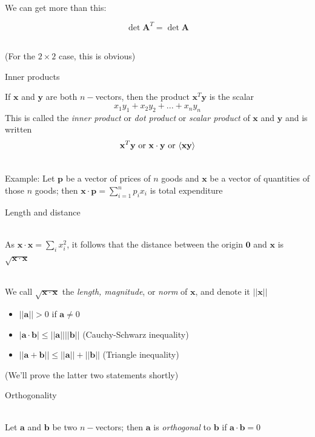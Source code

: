 \documentclass[10pt]{seminar}
\begin{document}
\begin{slide}
\ \\We can get more than this:

$$\det \mathbf{A}^T=\det \mathbf{A}$$

\ \\(For the $2\times 2$ case, this is obvious)

\newslide
Inner products

If $\mathbf{x}$ and $\mathbf{y}$ are both $n-$vectors, then the product $\mathbf{x}^T\mathbf{y}$ is the scalar 
$$x_1y_1+x_2y_2+...+x_ny_n$$
This is called the \textit{inner product} or \textit{dot product} or \textit{scalar product} of $\mathbf{x}$ and $\mathbf{y}$ and is written $$\mathbf{x}^T \mathbf{y}\hbox{ or }\mathbf{x}\cdot \mathbf{y} \hbox{ or } \langle\mathbf{x}\mathbf{y}\rangle$$

\ \\Example: Let $\mathbf{p}$ be a vector of prices of $n$ goods and $\mathbf{x}$ be a vector of quantities of those $n$ goods; then $\mathbf{x}\cdot \mathbf{p}=\sum_{i=1}^n p_i x_i$ is total expenditure

\newslide
Length and  distance

\ \\As $\mathbf{x}\cdot \mathbf{x}=\sum_{i} x_i^2$, it follows that the distance between the origin $\mathbf{0}$ and $\mathbf{x}$ is $\sqrt{\mathbf{x}\cdot\mathbf{x}}$

\ \\We call $\sqrt{\mathbf{x}\cdot\mathbf{x}}$ the \textit{length, magnitude}, or \textit{norm} of $\mathbf{x}$, and denote it $||\mathbf{x}||$

\begin{itemize}
\item $||\mathbf{a}||>0$ if $\mathbf{a}\not=0$
\item $|\mathbf{a}\cdot \mathbf{b}|\leq ||\mathbf{a}|| ||\mathbf{b}||$ (Cauchy-Schwarz inequality)
\item $||\mathbf{a}+\mathbf{b}||\leq ||\mathbf{a}||+||\mathbf{b}||$ (Triangle inequality)
\end{itemize}

(We'll prove the latter two statements shortly)

\newslide
Orthogonality

\ \\Let $\mathbf{a}$ and $\mathbf{b}$ be two $n-$vectors; then $\mathbf{a}$ is \textit{orthogonal} to $\mathbf{b}$ if $\mathbf{a}\cdot \mathbf{b}=0$

\begin{center}
\end{center}


\end{slide}
\end{document}

